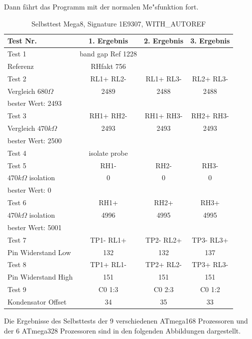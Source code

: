 Dann f\"ahrt das Programm mit der normalen Me"sfunktion fort.

\begin{table}[H]
  \begin{center}
    \begin{tabular}{| l | c | c | c |}
    \hline
Test Nr. & 1. Ergebnis & 2. Ergebnis & 3. Ergebnis \\
    \hline
    \hline
Test 1 & band gap Ref  1228 &  & \\
Referenz  & RHfakt 756 &  &  \\
    \hline
Test 2 & RL1+ RL2- & RL1+ RL3- & RL2+ RL3- \\
Vergleich \(680\Omega\) & 2489 & 2488 & 2488 \\
bester Wert: 2493 & & & \\
    \hline
Test 3 & RH1+ RH2- & RH1+ RH3- & RH2+ RH3- \\
Vergleich \(470k\Omega\) & 2493 & 2493 & 2493 \\
bester Wert: 2500 & & & \\
    \hline
Test 4 & isolate probe & & \\
    \hline
Test 5 & RH1- &  RH2- & RH3- \\
\(470k\Omega\) isolation & 0 & 0 & 0 \\
bester Wert: 0 & & & \\
    \hline
Test 6 & RH1+ & RH2+ & RH3+ \\
\(470k\Omega\) isolation & 4996 & 4995 & 4995 \\
bester Wert: 5001 & & & \\
    \hline
Test 7 & TP1- RL1+ & TP2- RL2+ & TP3- RL3+ \\
Pin Widerstand Low & 132 & 132 & 137 \\
    \hline
Test 8 & TP1+ RL1- & TP2+ RL2- & TP3+ RL3- \\
Pin Widerstand High & 151 & 151 & 151 \\
    \hline
Test 9 & C0  1:3 & C0  2:3 & C0 1:2 \\
Kondensator Offset & 34 & 35 & 33 \\
    \hline
    \end{tabular}
  \end{center}
  \caption{Selbsttest Mega8, Signature 1E9307, WITH\_AUTOREF}
  \label{tab:test_m8} 
\end{table}

Die Ergebnisse des Selbsttests der 9 verschiedenen ATmega168 Prozessoren und der 6 ATmega328 Prozessoren
sind in den folgenden Abbildungen dargestellt. 

